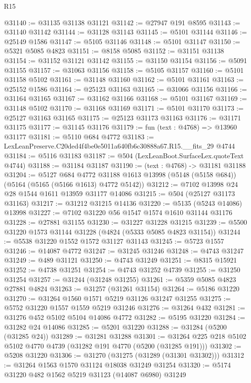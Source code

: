 \begin{lexlean}{R15}
\begin{coremodule}
{{{{{{{{{{{@31140 := @31135 @31138 @31121
@31142 := @27947 @191 @8595
@31143 := @31140 @31142
@31144 := @31128 @31143
@31145 := @5101 @31144
@31146 := @25149 @1586
@31147 := @5105 @31146
@31148 := @5101 @31147
@31150 := @5321 @5085 @4823
@31151 := @8158 @5085
@31152 := @31151 @31138
@31154 := @31152 @31121 @31142
@31155 := @31150 @31154
@31156 := @5091 @31155
@31157 := @31063 @31156
@31158 := @5105 @31157
@31160 := @5101 @31158 @5102
@31161 := @31148 @31160
@31162 := @5101 @31161
@31163 := @25152 @1586
@31164 := @25123 @31163
@31165 := @31066 @31156
@31166 := @31164 @31165
@31167 := @31162 @31166
@31168 := @5101 @31167
@31169 := @31148 @5102
@31170 := @31168 @31169
@31171 := @5101 @31170
@31173 := @25127 @31163 @31165
@31175 := @25123 @31173 @31163
@31176 := @31171 @31175
@31177 := @31145 @31176
@31179 := fun (text : @4768) => @13960 @31177
@31181 := @5110 @684 @4772
@31183 := LexLeanPreserve.C20ded4f4be0e5011a640fb6c30888a67.R15.__fits_29 @4744
@31184 := @5116 @31183
@31187 := @504 (LexLeanBoot.SurfaceLex.quoteText @4744)
@31188 := @31184 @31187
@31190 := (text : @4768) -> @31181 @31188
@31204 := @5127
    @684
    @4772
    @31188
    @1613
    @13998
    (@5148 (@5158 @684))
    (@5164 (@5165 (@5166 @1613) @4772 @5142))
@31212 := @7102 @13998 @24 @28 @1544 @1611 @13959 @31177 @14086
@31215 := @504 (@25127 @31173 @31163)
@31217 := @31212 @31215 @14136
@31220 := @5135 (@5243 @14086) @13998
@31227 := @7102 @31220 @56 @1547 @1574 @1610 @31144 @31176
@31228 := @27881 @31155
@31230 := @31227 @31228 @31215
@31239 := @5500 @31220 @1573 @31144 @31228 (@4824 (@5333 @5085 @4823 @31154))
@31244 := @5538 @31220 @1552 @1572 @31127 @31143
@31245 := @5723 @1557
@31246 := @14087 @4772
@31247 := @31245 @31246
@31248 := @4743 @31247
@31249 := @489 @31121
@31250 := @4743 @31249
@31251 := @8315 @15921
@31252 := @4738 @31251
@31254 := @4743 @31252 @4739
@31255 := @31250 @31254
@31257 := @31244 (@31248 @31255)
@31261 := @5359 @5085 @4823 @27881 @4824
@31263 := @31257 (@31261 @31154)
@31264 := @5186 @31220
@31270 := @31264 @1560 @1571 @5219 @31126 @31247 @31255
@31275 := @5752 @31220 @1557 @1559 @5219 @31246
@31276 := @31264 @432
@31281 := @31276 @452 @5102 @5104 @14086 @4772
@31282 := @5195 @31220
@31284 := @31282 @24 @14086
@31285 := @5201 @31220
@31288 := @31284 (@5200 (@31285 @24))
@31289 := @31281 @31288
@31301 := @31264 @225 @218 @5102 @5102 @4770 @4739 (@31282 @191 @4770 (@5200 (@31285 @191)))
@31302 := @5208 @31220
@31306 := @31270 (@31275 (@31289 (@31301 @31302)))
@31312 := @31264 @1563 @1570 @31124 @18038 @31249 @31254
@31320 := @5174 @31220 @482 @1562 @5219 @31123 (@14087 @6980) @31249
}}}}}}}}}}}
\end{coremodule}
\end{lexlean}
